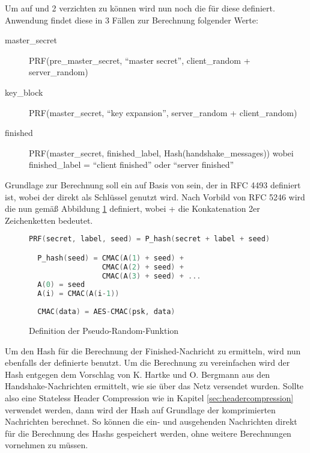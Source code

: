 Um auf  und 2 verzichten zu können wird nun noch die  für diese  definiert.
Anwendung findet diese in 3 Fällen zur Berechnung folgender Werte:
\begin{description}
  \item[master\_secret] PRF(pre\_master\_secret, "`master secret"', client\_random + server\_random)
  \item[key\_block] PRF(master\_secret, "`key expansion"', server\_random + client\_random)
  \item[finished] PRF(master\_secret, finished\_label, Hash(handshake\_messages)) \newline wobei finished\_label = "`client finished"' oder "`server finished"'
\end{description}
Grundlage zur Berechnung soll ein  auf Basis von  sein, der in RFC 4493 \cite{rfc4493} definiert ist, wobei der  direkt als Schlüssel genutzt wird.
Nach Vorbild von RFC 5246 \cite{rfc5246} wird die  nun gemäß Abbildung \ref{fig:def_psr} definiert, wobei
+ die Konkatenation 2er Zeichenketten bedeutet.
\begin{figure}[ht]
  \centering
  \begin{lstlisting}[language=c]
  PRF(secret, label, seed) = P_hash(secret + label + seed)

  P_hash(seed) = CMAC(A(1) + seed) +
                 CMAC(A(2) + seed) +
                 CMAC(A(3) + seed) + ...
  A(0) = seed
  A(i) = CMAC(A(i-1))
  
  CMAC(data) = AES-CMAC(psk, data)
  \end{lstlisting}
  \caption{Definition der Pseudo-Random-Funktion}
  \label{fig:def_psr}
\end{figure}

Um den Hash für die Berechnung der Finished-Nachricht zu ermitteln, wird nun ebenfalls der definierte  benutzt.
Um die Berechnung zu vereinfachen wird der Hash entgegen dem Vorschlag von K. Hartke und O. Bergmann \cite{draftcodtls} aus den
Handshake-Nachrichten ermittelt, wie sie über das Netz versendet wurden. Sollte also eine Stateless Header Compression wie in Kapitel
\ref{sec:headercompression} verwendet werden, dann wird der Hash auf Grundlage der komprimierten Nachrichten berechnet. So können
die ein- und ausgehenden Nachrichten direkt für die Berechnung des Hashs gespeichert werden, ohne weitere Berechnungen vornehmen zu müssen.